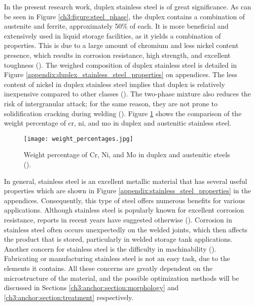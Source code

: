 In the present research work, duplex stainless steel is of great significance. As can be seen in Figure \ref{ch3:figure:steel_phase}, the duplex contains a combination of austenite and ferrite, approximately 50\% of each. It is more beneficial and extensively used in liquid storage facilities, as it yields a combination of properties. This is due to a large amount of chromium and less nickel content presence, which results in corrosion resistance, high strength, and excellent toughness (\cite{gunn1997duplex}). The weighed composition of duplex stainless steel is detailed in Figure \ref{appendix:duplex_stainless_steel_properties} on appendices. The less content of nickel in duplex stainless steel implies that duplex is relatively inexpensive compared to other classes (\cite{sourmail2005stainless}). The two-phase mixture also reduces the risk of intergranular attack; for the same reason, they are not prone to solidification cracking during welding (\cite{sourmail2005stainless}). Figure \ref{ch3:figure:weight} shows the comparison of the weight percentage of \acrfull{cr}, \acrfull{ni}, and \acrfull{mo} in duplex and austenitic stainless steel.
 
\begin{figure}[H]
    \centering
    \texttt{[image: weight\_percentages.jpg]}
    \caption{Weight percentage of Cr, Ni, and Mo in duplex and austenitic steels (\cite{sourmail2005stainless}).}
    \label{ch3:figure:weight}
\end{figure}

In general, stainless steel is an excellent metallic material that has several useful properties which are shown in Figure \ref{appendix:stainless_steel_properties} in the appendices. Consequently, this type of steel offers numerous benefits for various applications. Although stainless steel is popularly known for excellent corrosion resistance, reports in recent years have suggested otherwise (\cite{karayan2014weld}). Corrosion in stainless steel often occurs unexpectedly on the welded joints, which then affects the product that is stored, particularly in welded storage tank applications. Another concern for stainless steel is the difficulty in machinability (\cite{grzesik2008advanced}). Fabricating or manufacturing stainless steel is not an easy task, due to the elements it contains. All these concerns are greatly dependent on the microstructure of the material, and the possible optimization methods will be discussed in Sections \ref{ch3:anchor:section:morphology} and \ref{ch3:anchor:section:treatment} respectively.

